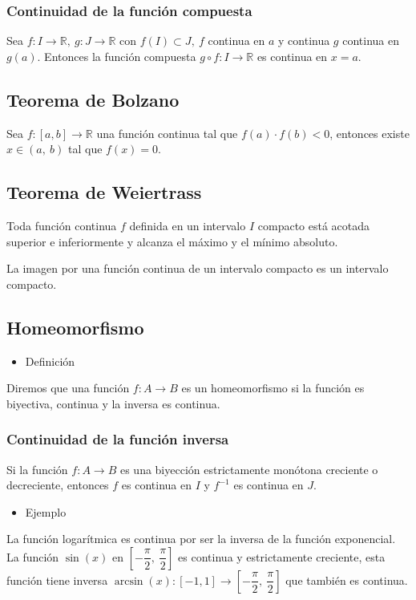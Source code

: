 \subsubsection{Continuidad de la función compuesta}
Sea $f:I \rightarrow\mathbb{R},~g:J\rightarrow\mathbb{R}$ con $f(I)\subset J,~f$ continua en $a$ y continua $g$ continua en $g(a)$. Entonces la función compuesta $g\circ f:I\rightarrow\mathbb{R}$ es continua en $x=a$.
\subsection{Teorema de Bolzano}
Sea $f:[a,b]\rightarrow\mathbb{R}$ una función continua tal que $f(a)\cdot f(b)<0$, entonces existe $x\in (a,~b)$ tal que $f(x)=0$.
\subsection{Teorema de Weiertrass}
Toda función continua $f$ definida en un intervalo $I$ compacto está acotada superior e inferiormente y alcanza el máximo y el mínimo absoluto.

La imagen por una función continua de un intervalo compacto es un intervalo compacto.
\subsection{Homeomorfismo}
\begin{itemize}[label=\color{red}\textbullet, leftmargin=*]
	\item \color{lightblue}Definición
\end{itemize}
Diremos que una función $f:A\rightarrow B$ es un homeomorfismo si la función es biyectiva, continua y la inversa es continua.
\subsubsection{Continuidad de la función inversa}
Si la función $f:A \rightarrow B$ es una biyección estrictamente monótona creciente o decreciente, entonces $f$ es continua en $I$ y $f^{-1}$ es continua en $J$.
\begin{itemize}[label=\color{red}\textbullet, leftmargin=*]
	\item \color{lightblue}Ejemplo
\end{itemize}
La función logarítmica es continua por ser la inversa de la función exponencial. La función $\sin(x)$ en $\left[-\dfrac{\pi}{2},~\dfrac{\pi}{2}\right]$ es continua y estrictamente creciente, esta función tiene inversa $\arcsin(x):[-1,1]\rightarrow\left[-\dfrac{\pi}{2},~\dfrac{\pi}{2}\right]$ que también es continua.
